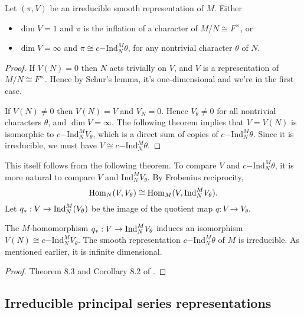\begin{thm}\label{inf dim}
    Let $(\pi,V)$ be an irreducible smooth representation of $M$. Either 
    \begin{itemize}
        \item $\dim V=1$ and $\pi$ is the inflation of a character of $M/N \cong F^\times$, or
        \item $\dim V = \infty$ and $\pi \cong c\mathrm{-Ind}_N^M \theta$, for any nontrivial character $\theta$ of $N$.
    \end{itemize}
\end{thm}
\begin{proof}
    If $V(N) = 0$ then $N$ acts trivially on $V$, and $V$ is a representation of $M/N \cong F^\times$. Hence by Schur's lemma, it's one-dimensional and we're in the first case.
    
    If $V(N) \not= 0$ then $V(N) = V$ and $V_N = 0$. Hence $V_\theta \not= 0$ for all nontrivial characters $\theta$, and $\dim V = \infty$. The following theorem implies that $V = V(N)$ is isomorphic to $c\mathrm{-Ind}_N^M V_\theta$, which is a direct sum of copies of $c\mathrm{-Ind}_N^M \theta$. Since it is irreducible, we must have $V\cong c\mathrm{-Ind}_N^M \theta$. 
\end{proof}

This itself follows from the following theorem. To compare $V$ and $c\mathrm{-Ind}_N^M \theta$, it is more natural to compare $V$ and $\mathrm{Ind}_N^M V_\theta$. By Frobenius reciprocity,
$$\mathrm{Hom}_N(V,V_\theta) \cong \mathrm{Hom}_M(V,\mathrm{Ind}_N^M V_\theta).$$
Let $q_*: V \to \mathrm{Ind}_N^M(V_\theta)$ be the image of the quotient map $q: V \to V_\theta$.

\begin{thm}\label{mirabolic}
    The $M$-homomorphism $q_*: V \to \mathrm{Ind}_N^M V_\theta$ induces an isomorphism $V(N) \cong c\mathrm{-Ind}_N^M V_\theta$. The smooth representation $c\mathrm{-Ind}_N^M \theta$ of $M$ is irreducible. As mentioned earlier, it is infinite dimensional.
\end{thm}
\begin{proof}
    Theorem 8.3 and Corollary 8.2 of \cite{BH1}.
\end{proof}



\subsection{Irreducible principal series representations}


